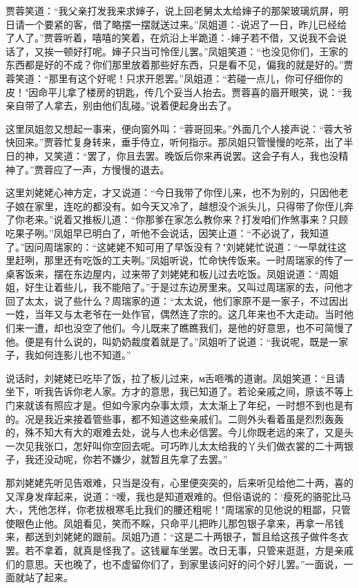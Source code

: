 贾蓉笑道：“我父亲打发我来求婶子，说上回老舅太太给婶子的那架玻璃炕屏，明日请一个要紧的客，借了略摆一摆就送过来。”凤姐道：-说迟了一日，昨儿已经给了人了。”贾蓉听着，嘻嘻的笑着，在炕沿上半跪道：-婶子若不借，又说我不会说话了，又挨一顿好打呢。婶子只当可怜侄儿罢。”凤姐笑道：“也没见你们，王家的东西都是好的不成？你们那里放着那些好东西，只是看不见，偏我的就是好的。”贾蓉笑道：“那里有这个好呢！只求开恩罢。”凤姐道：“若碰一点儿，你可仔细你的皮！"因命平儿拿了楼房的钥匙，传几个妥当人抬去。贾蓉喜的眉开眼笑，说：“我亲自带了人拿去，别由他们乱碰。”说着便起身出去了。

这里凤姐忽又想起一事来，便向窗外叫：“蓉哥回来。”外面几个人接声说：“蓉大爷快回来。”贾蓉忙复身转来，垂手侍立，听何指示。那凤姐只管慢慢的吃茶，出了半日的神，又笑道：“罢了，你且去罢。晚饭后你来再说罢。这会子有人，我也没精神了。”贾蓉应了一声，方慢慢的退去。

这里刘姥姥心神方定，才又说道：“今日我带了你侄儿来，也不为别的，只因他老子娘在家里，连吃的都没有。如今天又冷了，越想没个派头儿，只得带了你侄儿奔了你老来。”说着又推板儿道：“你那爹在家怎么教你来？打发咱们作煞事来？只顾吃果子咧。”凤姐早已明白了，听他不会说话，因笑止道：“不必说了，我知道了。”因问周瑞家的：“这姥姥不知可用了早饭没有？"刘姥姥忙说道：“一早就往这里赶咧，那里还有吃饭的工夫咧。”凤姐听说，忙命快传饭来。一时周瑞家的传了一桌客饭来，摆在东边屋内，过来带了刘姥姥和板儿过去吃饭。凤姐说道：“周姐姐，好生让着些儿，我不能陪了。”于是过东边房里来。又叫过周瑞家的去，问他才回了太太，说了些什么？周瑞家的道：“太太说，他们家原不是一家子，不过因出一姓，当年又与太老爷在一处作官，偶然连了宗的。这几年来也不大走动。当时他们来一遭，却也没空了他们。今儿既来了瞧瞧我们，是他的好意思，也不可简慢了他。便是有什么说的，叫奶奶裁度着就是了。”凤姐听了说道：“我说呢，既是一家子，我如何连影儿也不知道。”

说话时，刘姥姥已吃毕了饭，拉了板儿过来，м舌咂嘴的道谢。凤姐笑道：“且请坐下，听我告诉你老人家。方才的意思，我已知道了。若论亲戚之间，原该不等上门来就该有照应才是。但如今家内杂事太烦，太太渐上了年纪，一时想不到也是有的。况是我近来接着管些事，都不知道这些亲戚们。二则外头看着虽是烈烈轰轰的，殊不知大有大的艰难去处，说与人也未必信罢。今儿你既老远的来了，又是头一次见我张口，怎好叫你空回去呢。可巧昨儿太太给我的丫头们做衣裳的二十两银子，我还没动呢，你若不嫌少，就暂且先拿了去罢。”

那刘姥姥先听见告艰难，只当是没有，心里便突突的，后来听见给他二十两，喜的又浑身发痒起来，说道：“嗳，我也是知道艰难的。但俗语说的：`瘦死的骆驼比马大-，凭他怎样，你老拔根寒毛比我们的腰还粗呢！"周瑞家的见他说的粗鄙，只管使眼色止他。凤姐看见，笑而不睬，只命平儿把昨儿那包银子拿来，再拿一吊钱来，都送到刘姥姥的跟前。凤姐乃道：“这是二十两银子，暂且给这孩子做件冬衣罢。若不拿着，就真是怪我了。这钱雇车坐罢。改日无事，只管来逛逛，方是亲戚们的意思。天也晚了，也不虚留你们了，到家里该问好的问个好儿罢。”一面说，一面就站了起来。

